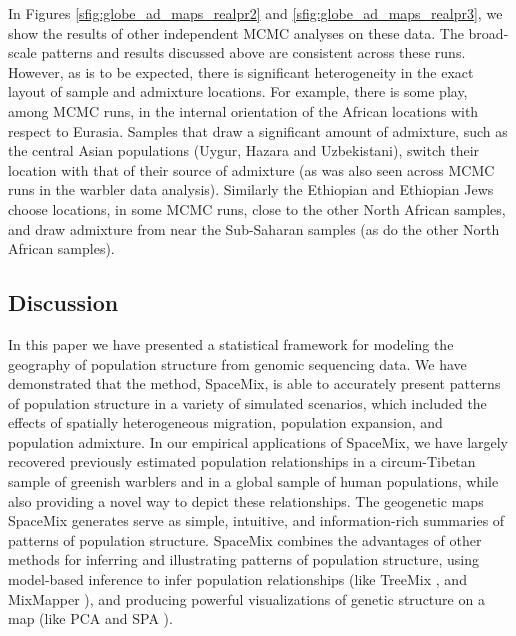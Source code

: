 \documentclass[12pt]{article}
\begin{document}
In Figures \ref{sfig:globe_ad_maps_realpr2} and \ref{sfig:globe_ad_maps_realpr3}, we show the results of other independent MCMC analyses on these data. The broad-scale patterns and results discussed above are consistent across these runs. However, as is to be expected, there is significant heterogeneity in the exact layout of sample and admixture locations. For example, there is some play, among MCMC runs, in the internal orientation of the African locations with respect to Eurasia.  Samples that draw a significant amount of admixture, such as the central Asian populations (Uygur, Hazara and Uzbekistani), switch their location with that of their source of admixture (as was also seen across MCMC runs in the warbler data analysis). Similarly the Ethiopian and Ethiopian Jews choose locations, in some MCMC runs, close to the other North African samples, and draw admixture from near the Sub-Saharan samples (as do the other North African samples).

\subsection*{Discussion}
In this paper we have presented a statistical framework for modeling the geography of population structure from genomic sequencing data.
We have demonstrated that the method, SpaceMix, is able to accurately present patterns of population structure in a variety of simulated scenarios, which included the effects of spatially heterogeneous migration, population expansion, and population admixture.  In our empirical applications of SpaceMix, we have largely recovered previously estimated population relationships in a circum-Tibetan sample of greenish warblers and in a global sample of human populations, while also providing a novel way to depict these relationships.  The geogenetic maps SpaceMix generates serve as simple, intuitive, and information-rich summaries of patterns of population structure. 
SpaceMix combines the advantages of other methods for inferring and illustrating patterns of population structure, 
using model-based inference to infer population relationships (like TreeMix \citep{Treemix}, and MixMapper \citep{lipson_mixmapper_2013}), 
and producing powerful visualizations of genetic structure on a map (like PCA \citep{Patterson2006} and SPA \citep{yang_spatial_2014}).
\end{document}
